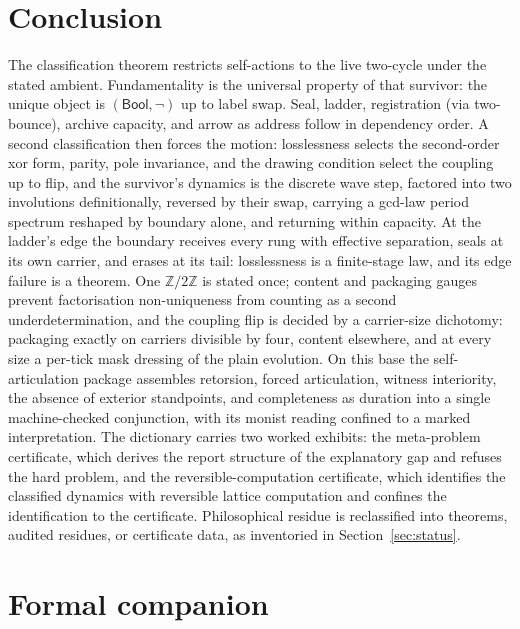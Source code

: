 \documentclass[11pt,a4paper]{article}
\theoremstyle{plain}
\theoremstyle{definition}
\theoremstyle{remark}
\newcommand{\Bool}{\mathsf{Bool}}
\newcommand{\Ztwo}{\mathbb{Z}/2\mathbb{Z}}
\begin{document}
\section{Conclusion}
\label{sec:concl}

The classification theorem restricts self-actions to the live two-cycle
under the stated ambient. Fundamentality is the universal property of
that survivor: the unique object is $(\Bool,\neg)$ up to label swap.
Seal, ladder, registration (via two-bounce), archive capacity, and arrow
as address follow in dependency order. A second classification then
forces the motion: losslessness selects the second-order xor form,
parity, pole invariance, and the drawing condition select the coupling
up to flip, and the survivor's dynamics is the discrete wave step,
factored into two involutions definitionally, reversed by their swap,
carrying a gcd-law period spectrum reshaped by boundary alone, and
returning within capacity. At the ladder's edge the boundary receives
every rung with effective separation, seals at its own carrier, and
erases at its tail: losslessness is a finite-stage law, and its edge
failure is a theorem. One $\Ztwo$ is stated once; content
and packaging gauges prevent factorisation non-uniqueness from counting
as a second underdetermination, and the coupling flip is decided by a
carrier-size dichotomy: packaging exactly on carriers divisible by
four, content elsewhere, and at every size a per-tick mask dressing
of the plain evolution. On this base the self-articulation
package assembles retorsion, forced articulation, witness interiority,
the absence of exterior standpoints, and completeness as duration into
a single machine-checked conjunction, with its monist reading confined
to a marked interpretation. The dictionary carries two worked exhibits:
the meta-problem certificate, which derives the report structure of the
explanatory gap and refuses the hard problem, and the
reversible-computation certificate, which identifies the classified
dynamics with reversible lattice computation and confines the
identification to the certificate. Philosophical residue is
reclassified into theorems, audited residues, or
certificate data, as inventoried in Section~\ref{sec:status}.

\section*{Formal companion}
\label{sec:companion}
\end{document}
